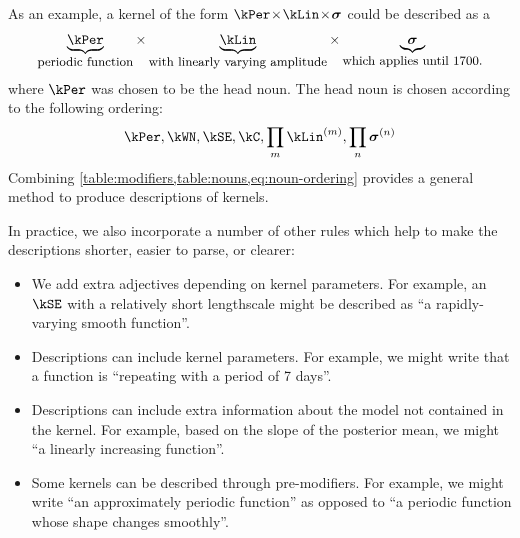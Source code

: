 As an example, a kernel of the form $\kPer \kerntimes  \kLin \kerntimes \boldsymbol{\sigma}$ could be described as a
\begin{align*}
\underbrace{\kPer}_{\textnormal{\small periodic function}} \times 
\underbrace{\kLin}_{\textnormal{\small with linearly varying amplitude}} \times 
\underbrace{\boldsymbol{\sigma}}_{\textnormal{\small which applies until 1700.}}
\end{align*}
where $\kPer$ was chosen to be the head noun.
%
The head noun is chosen according to the following ordering:
\begin{align}
\kPer, \kWN, \kSE, \kC, \prod_m \kLin^{(m)}, \prod_n \boldsymbol\sigma^{(n)}
\label{eq:noun-ordering}
\end{align}
Combining \cref{table:modifiers,table:nouns,eq:noun-ordering} provides a general method to produce descriptions of kernels.

In practice, we also incorporate a number of other rules which help to make the descriptions shorter, easier to parse, or clearer:
\begin{itemize}
  \item We add extra adjectives depending on kernel parameters.
        For example, an $\kSE$ with a relatively short lengthscale might be described as ``a rapidly-varying smooth function''.
  \item Descriptions can include kernel parameters.
        For example, we might write that a function is ``repeating with a period of 7 days''.
  \item Descriptions can include extra information about the model not contained in the kernel.
        For example, based on the slope of the posterior mean, we might ``a linearly increasing function''.
  \item Some kernels can be described through pre-modifiers.
        For example, we might write ``an approximately periodic function'' as opposed to ``a periodic function whose shape changes smoothly''.
\end{itemize}

